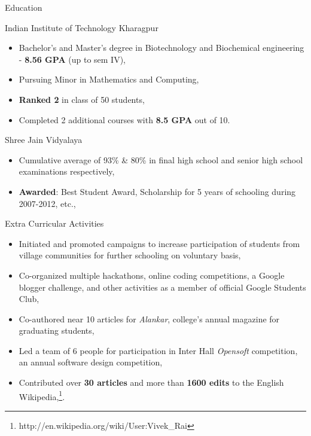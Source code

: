 \documentclass{article}
\newlength{\tabin}
\newlength{\secsep}
\newcommand{\lineunder}{\vspace*{-8pt} \\ \hspace*{-6pt} \hrulefill \\ \vspace*{-15pt}}
\newenvironment{tabbedsection}[1]{
  \begin{list}{}{
      \setlength{\itemsep}{0pt}
      \setlength{\labelsep}{0pt}
      \setlength{\labelwidth}{0pt}
      \setlength{\leftmargin}{\tabin}
      \setlength{\rightmargin}{\tabin}
      \setlength{\listparindent}{0pt}
      \setlength{\parsep}{0pt}
      \setlength{\parskip}{0pt}
      \setlength{\partopsep}{0pt}
      \setlength{\topsep}{#1}
    }
  \item[]
}{\end{list}}
\newenvironment{resume_section}[1]{
  \filbreak
  \vspace{2\secsep}
  \textsc{\large#1}
  \lineunder
  \begin{tabbedsection}{\secsep}
}{\end{tabbedsection}}
\newenvironment{resume_subsection}[2][]{
  \textbf{#2} \hfill {\footnotesize #1} \hspace*{-3.5em}
  \begin{tabbedsection}{0.5\secsep}
}{\end{tabbedsection}}
\newenvironment{subitems}{
  \renewcommand{\labelitemi}{$\cdot$}
  \begin{itemize}
      \setlength{\labelsep}{1em}
}{\end{itemize}}
\begin{document}
\begin{resume_section}{Education}
  \begin{resume_subsection}{Indian Institute of Technology Kharagpur}
    \begin{subitems}
      \item Bachelor's and Master's degree in Biotechnology and Biochemical engineering - \textbf{8.56 GPA} (up to sem IV),
      \item Pursuing Minor in Mathematics and Computing,
      \item \textbf{Ranked 2} in class of 50 students,
      \item Completed 2 additional courses with \textbf{8.5 GPA} out of 10.
    \end{subitems}
  \end{resume_subsection}

  \begin{resume_subsection}{Shree Jain Vidyalaya}
    \begin{subitems}
      \item Cumulative average of 93\% \& 80\% in final high school and senior high school examinations respectively,
      \item \textbf{Awarded}: Best Student Award, Scholarship for 5 years of schooling during 2007-2012, etc.,
    \end{subitems}
  \end{resume_subsection}
\end{resume_section}

\begin{resume_section}{Extra Curricular Activities}
    \begin{subitems}
    \item Initiated and promoted campaigns to increase participation of students from village communities for further schooling on voluntary basis,
      \item Co-organized multiple hackathons, online coding competitions, a Google blogger challenge, and other activities as a member of official Google Students Club,
      \item Co-authored near 10 articles for \emph{Alankar}, college's annual magazine for graduating students,
      \item Led a team of 6 people for participation in Inter Hall \emph{Opensoft} competition, an annual software design competition,
      \item Contributed over \textbf{30 articles} and more than \textbf{1600 edits} to the English Wikipedia,\footnote{http://en.wikipedia.org/wiki/User:Vivek\_Rai}.
    \end{subitems}
\end{resume_section}
\end{document}
